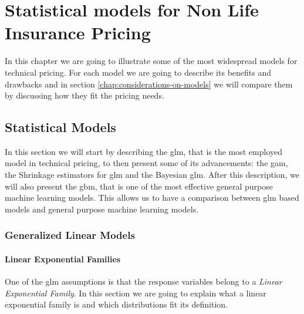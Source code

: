 \documentclass[a4paper, twoside, openright, 12pt]{report}
\theoremstyle{definition}
\theoremstyle{definition}
\theoremstyle{definition}
\theoremstyle{remark}
\begin{document}
\hypertarget{chap:models}{%
\chapter{Statistical models for Non Life Insurance Pricing}\label{chap:models}}

\minitoc  


In this chapter we are going to illustrate some of the most widespread models for technical pricing. For each model we are going to describe its benefits and drawbacks and in section \ref{chap:considerations-on-models} we will compare them by discussing how they fit the pricing needs.

\hypertarget{statistical-models}{%
\section{Statistical Models}\label{statistical-models}}

In this section we will start by describing the \ac{glm}, that is the most employed model in technical pricing, to then present some of its advancements: the \ac{gam}, the Shrinkage estimators for \ac{glm} and the Bayesian \ac{glm}. After this description, we will also present the \ac{gbm}, that is one of the most effective general purpose machine learning models. This allows us to have a comparison between \ac{glm} based models and general purpose machine learning models.

\hypertarget{chap:glm}{%
\subsection{Generalized Linear Models}\label{chap:glm}}

\hypertarget{chap:linear-exp-families}{%
\subsubsection{Linear Exponential Families}\label{chap:linear-exp-families}}

One of the \ac{glm} assumptions is that the response variables belong to a \emph{Linear Exponential Family}. In this section we are going to explain what a linear exponential family is and which distributions fit its definition.
\end{document}

